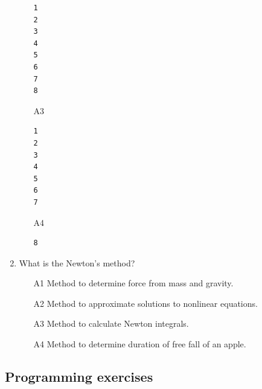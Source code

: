 \begin{enumerate}
\begin{enumerate}
\begin{verbatim}
1
2
3
4
5
6
7
8
\end{verbatim}
\item[A3] 
\begin{verbatim}
1
2
3
4
5
6
7
\end{verbatim}
\item[A4] 
\begin{verbatim}
8
\end{verbatim}
\end{enumerate}
\item What is the Newton's method?
\begin{enumerate}
\item[A1] Method to determine force from mass and gravity.
\item[A2] Method to approximate solutions to nonlinear equations.
\item[A3] Method to calculate Newton integrals.
\item[A4] Method to determine duration of free fall of an apple.
\end{enumerate}
\end{enumerate}


\subsection{Programming exercises}


